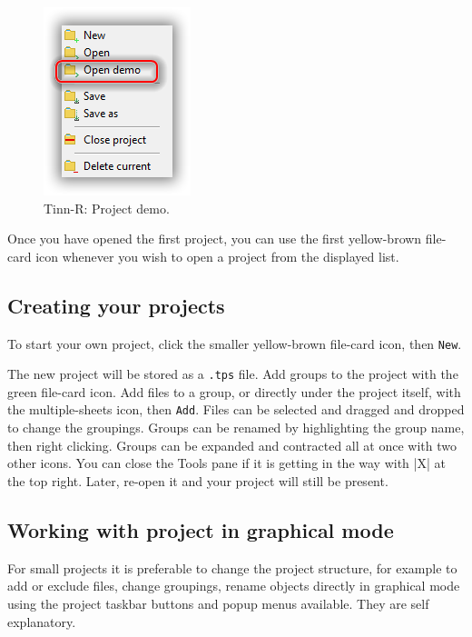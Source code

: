 \begin{figure}[H]
  \begin{center}
    \includegraphics[scale=0.60]{./res/projects_open_demo.png}
  \end{center}
  \caption{Tinn-R: Project demo.}
  \label{fig:tinn-r_projects_open_demo}
\end{figure}

Once you have opened the first project, you can use the first
yellow-brown file-card icon whenever you wish to open a project from the displayed list. 

\subsection{Creating your projects}
To start your own project, click the smaller yellow-brown file-card icon, then \texttt{New}.

The new project will be stored as a \texttt{.tps} file. Add groups to the project with the green file-card icon.
Add files to a group, or directly under the project itself, with the multiple-sheets icon, then \texttt{Add}. 
Files can be selected and dragged and dropped to change the groupings. Groups can be renamed by highlighting 
the group name, then right clicking. Groups can be expanded and contracted all at once with two other icons. 
You can close the Tools pane if it is getting in the way with |X| at the top right.  
Later, re-open it and your project will still be present.

\subsection{Working with project in graphical mode}
For small projects it is preferable to change the project structure, for example to add or exclude files, 
change groupings, rename objects directly in graphical mode using the project taskbar buttons 
and popup menus available. They are self explanatory.

